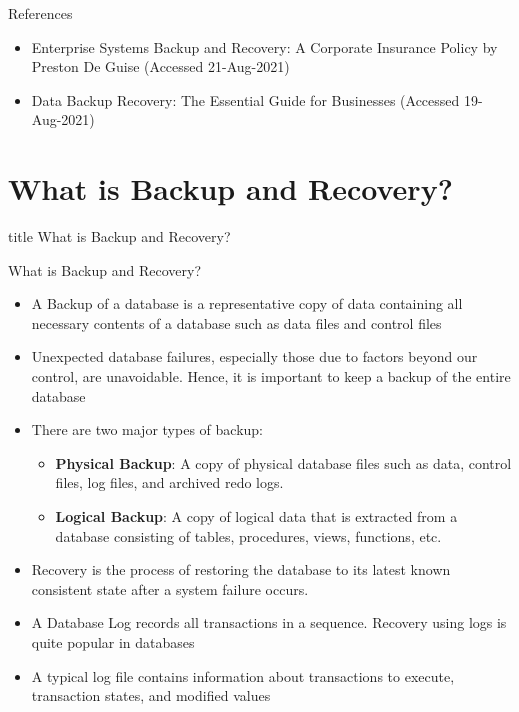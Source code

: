 \documentclass[aspectratio=169, xcolor=dvipsnames]{beamer}
\begin{document}
\begin{frame}{References}
    \begin{itemize}[<+->]
        \item Enterprise Systems Backup and Recovery: A Corporate Insurance Policy by Preston De Guise (Accessed 21-Aug-2021)
        \item Data Backup Recovery: The Essential Guide for Businesses (Accessed 19-Aug-2021)
    \end{itemize}
\end{frame}

\section{What is Backup and Recovery?}

\begin{frame}
  \vfill
  \centering
  \begin{beamercolorbox}[sep=8pt,center,shadow=true,rounded=true]{title}
    What is Backup and Recovery?\par%
  \end{beamercolorbox}
  \vfill
\end{frame}

\begin{frame}{What is Backup and Recovery?}
    \begin{itemize}[<+->]
        \item A Backup of a database is a representative copy of data containing all necessary contents of a database such as data files and control files
        \item Unexpected database failures, especially those due to factors beyond our control, are unavoidable. Hence, it is important to keep a backup of the entire database
        \item There are two major types of backup:
        \begin{itemize}
            \item[$\triangleright$] \textbf{Physical Backup}: A copy of physical database files such as data, control files, log files, and archived redo logs.
            \item[$\triangleright$] \textbf{Logical Backup}: A copy of logical data that is extracted from a database consisting of tables, procedures, views, functions, etc.
        \end{itemize}
        \item Recovery is the process of restoring the database to its latest known consistent state after a system failure occurs.
        \item A Database Log records all transactions in a sequence. Recovery using logs is quite popular in databases
        \item A typical log file contains information about transactions to execute, transaction states, and modified values
    \end{itemize}
\end{frame}
\end{document}
